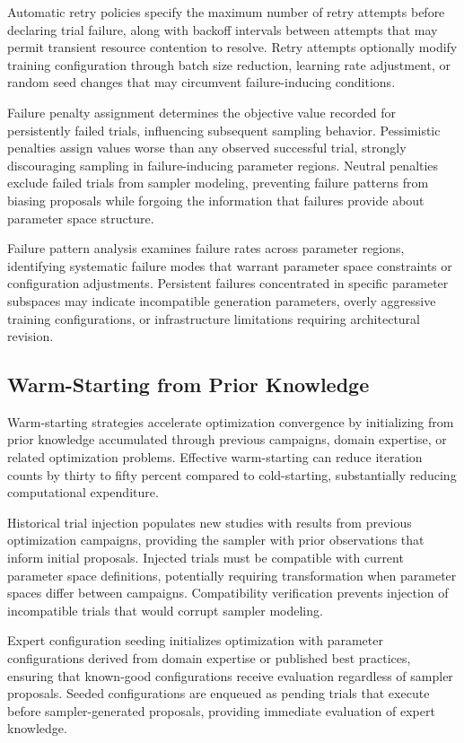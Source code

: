 Automatic retry policies specify the maximum number of retry attempts before declaring trial failure, along with backoff intervals between attempts that may permit transient resource contention to resolve. Retry attempts optionally modify training configuration through batch size reduction, learning rate adjustment, or random seed changes that may circumvent failure-inducing conditions.

Failure penalty assignment determines the objective value recorded for persistently failed trials, influencing subsequent sampling behavior. Pessimistic penalties assign values worse than any observed successful trial, strongly discouraging sampling in failure-inducing parameter regions. Neutral penalties exclude failed trials from sampler modeling, preventing failure patterns from biasing proposals while forgoing the information that failures provide about parameter space structure.

Failure pattern analysis examines failure rates across parameter regions, identifying systematic failure modes that warrant parameter space constraints or configuration adjustments. Persistent failures concentrated in specific parameter subspaces may indicate incompatible generation parameters, overly aggressive training configurations, or infrastructure limitations requiring architectural revision.

\subsection{Warm-Starting from Prior Knowledge}

Warm-starting strategies accelerate optimization convergence by initializing from prior knowledge accumulated through previous campaigns, domain expertise, or related optimization problems. Effective warm-starting can reduce iteration counts by thirty to fifty percent compared to cold-starting, substantially reducing computational expenditure.

Historical trial injection populates new studies with results from previous optimization campaigns, providing the sampler with prior observations that inform initial proposals. Injected trials must be compatible with current parameter space definitions, potentially requiring transformation when parameter spaces differ between campaigns. Compatibility verification prevents injection of incompatible trials that would corrupt sampler modeling.

Expert configuration seeding initializes optimization with parameter configurations derived from domain expertise or published best practices, ensuring that known-good configurations receive evaluation regardless of sampler proposals. Seeded configurations are enqueued as pending trials that execute before sampler-generated proposals, providing immediate evaluation of expert knowledge.

